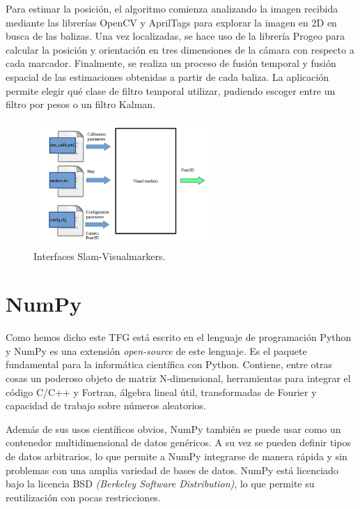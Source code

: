 \hspace{1cm} Para estimar la posición, el algoritmo comienza analizando la imagen recibida mediante las librerías OpenCV y AprilTags para explorar la imagen en 2D en busca de las balizas. Una vez localizadas, se hace uso de la librería Progeo para calcular la posición y orientación en tres dimensiones de la cámara con respecto a cada marcador. Finalmente, se realiza un proceso de fusión temporal y fusión espacial de las estimaciones obtenidas a partir de cada baliza. La aplicación permite elegir qué clase de filtro temporal utilizar, pudiendo escoger entre un filtro por pesos o un filtro Kalman.

\begin{figure}[H]
	\begin{center}
		\includegraphics[width=0.6\textwidth]{imag/IMG23.png}
				\caption{Interfaces Slam-Visualmarkers.} 
	\label{fig:Interfaces Slam-Visualmarkers.}	
	\end{center}
\end{figure}

\section{NumPy}
\hspace{1cm} Como hemos dicho este TFG está escrito en el lenguaje de programación Python y NumPy es una extensión \textit{open-source} de este lenguaje. Es el paquete fundamental para la informática científica con Python. Contiene, entre otras cosas un poderoso objeto de matriz N-dimensional, herramientas para integrar el código C/C++ y Fortran, álgebra lineal útil, transformadas de Fourier y capacidad de trabajo sobre números aleatorios. 

\hspace{1cm} Además de sus usos científicos obvios, NumPy también se puede usar como un contenedor multidimensional de datos genéricos. A su vez se pueden definir tipos de datos arbitrarios, lo que permite a NumPy integrarse de manera rápida y sin problemas con una amplia variedad de bases de datos. NumPy está licenciado bajo la licencia BSD \textit{(Berkeley Software Distribution)}, lo que permite su reutilización con pocas restricciones.
